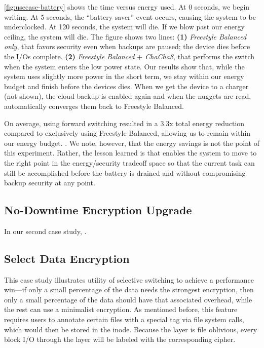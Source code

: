 \cref{fig:usecase-battery} shows the time versus energy used. At 0 seconds, we
begin writing. At 5 seconds, the ``battery saver'' event occurs, causing the
system to be underclocked. At 120 seconds, the system will die. If we blow past
our energy ceiling, the system will die. The figure shows two lines:
%
{\bf (1)} {\em Freestyle Balanced only}, that favors security even when backups
are paused; the device dies before the I/Os complete.
%
{\bf (2)} {\em Freestyle Balanced $+$ ChaCha8}, that performs the switch when
the system enters the low power state. Our results show that, while the system
uses slightly more power in the short term, we stay within our energy budget and
finish before the devices dies.
%
When we get the device to a charger (not shown), the cloud backup is enabled
again and when the nuggets are read, \sys automatically converges them back to
Freestyle Balanced.

On average, using forward switching resulted in a 3.3x total energy reduction
compared to exclusively using Freestyle Balanced, allowing us to remain within
our energy budget. . We note, however, that the energy savings is not
the point of this experiment. Rather, the lesson learned is that \sys enables
the system to move to the right point in the energy/security tradeoff space so
that the current task can still be accomplished before the battery is drained
and without compromising backup security at any point.


\subsection{No-Downtime Encryption Upgrade}\label{subsec:usecase-upgrade}

In our second case study, .


\subsection{Select Data Encryption}\label{subsec:usecase-agnostic}

This case study illustrates utility of selective switching to achieve a
performance win---if only a small percentage of the data needs the strongest
encryption, then only a small percentage of the data should have that associated
overhead, while the rest can use a minimalist encryption. As mentioned before,
this feature requires users to annotate certain files with a special tag via
file system calls, which would then be stored in the inode. Because the \sys
layer is file oblivious, every block I/O through the \sys layer will be labeled
with the corresponding cipher.

